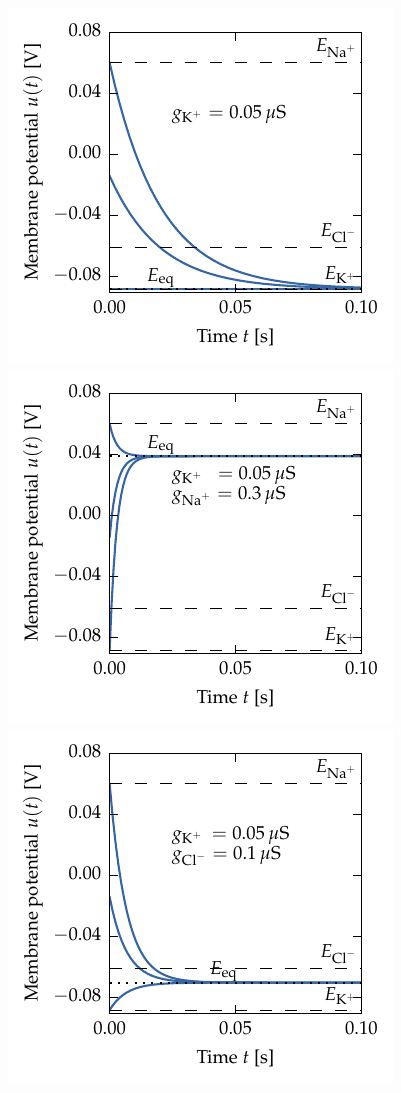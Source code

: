 \begin{figure}
	\centering
	\includegraphics[trim=0.1cm 0.75cm 0.25cm 0.1cm,clip]{media/chp2/base_membrane_eq1.pdf}
	\includegraphics[trim=0.75cm 0.75cm 0.25cm 0.1cm,clip]{media/chp2/base_membrane_eq2.pdf}
	\includegraphics[trim=0.1cm 0.1cm 0.25cm 0.1cm,clip]{media/chp2/base_membrane_eq3.pdf}

\end{figure}
